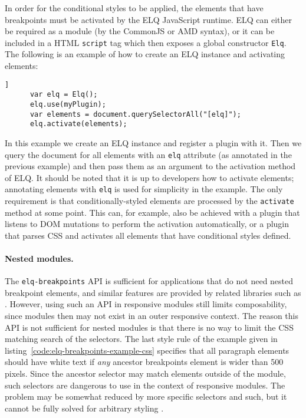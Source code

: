 \documentclass[]{llncs}
\newcommand{\code}[1]{\texttt{#1}}
\newcommand{\elq}{ELQ}
\begin{document}
    \noindent
    In order for the conditional styles to be applied, the elements that have breakpoints must be activated by the \elq{} JavaScript runtime.
    \elq{} can either be required as a module (by the CommonJS or AMD syntax), or it can be included in a HTML \code{script} tag which then exposes a global constructor \code{Elq}.
    The following is an example of how to create an \elq{} instance and activating elements:

    \begin{lstlisting}[gobble=6,caption={}]]
      var elq = Elq();
      elq.use(myPlugin);
      var elements = document.querySelectorAll("[elq]");
      elq.activate(elements);
    \end{lstlisting}

    \noindent
    In this example we create an \elq{} instance and register a plugin with it.
    Then we query the document for all elements with an \code{elq} attribute (as annotated in the previous example) and then pass them as an argument to the activation method of \elq{}.
    It should be noted that it is up to developers how to activate elements; annotating elements with \code{elq} is used for simplicity in the example.
    The only requirement is that conditionally-styled elements are processed by the \code{activate} method at some point.
    This can, for example, also be achieved with a plugin that listens to DOM mutations to perform the activation automatically, or a plugin that parses CSS and activates all elements that have conditional styles defined.

    \paragraph{Nested modules.}
      The \code{elq-breakpoints} API is sufficient for applications that do not need nested breakpoint elements, and similar features are provided by related libraries such as \cite{eq_imp_eqjs,eq_imp_responsive-elements-2}.
      However, using such an API in responsive modules still limits composability, since modules then may not exist in an outer responsive context.
      The reason this API is not sufficient for nested modules is that there is no way to limit the CSS matching search of the selectors.
      The last style rule of the example given in listing~\ref{code:elq-breakpoints-example-css} specifies that all paragraph elements should have white text if \emph{any} ancestor breakpoints element is wider than 500 pixels.
      Since the ancestor selector may match elements outside of the module, such selectors are dangerous to use in the context of responsive modules.
      The problem may be somewhat reduced by more specific selectors and such, but it cannot be fully solved for arbitrary styling \cite{elq-thesis}.
\end{document}
